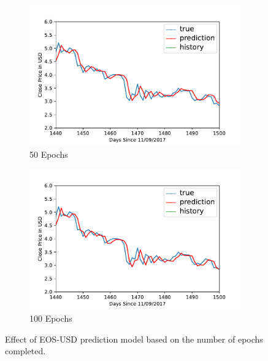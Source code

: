 \begin{figure}[htb]
\begin{subfigure}[b]{0.49\textwidth}
         \label{fig:epochs-25}
     \end{subfigure}
     \\
     \begin{subfigure}[b]{0.49\textwidth}
         \centering
         \includegraphics[width=\textwidth]{images/EOS-USD-epoch-50.pdf}
         \caption{50 Epochs}
         \label{fig:epochs-50}
     \end{subfigure}
     \hfill
    \begin{subfigure}[b]{0.49\textwidth}
         \centering
         \includegraphics[width=\textwidth]{images/EOS-USD-epoch-100.pdf}
         \caption{100 Epochs}
         \label{fig:epochs-100}
     \end{subfigure}

\caption{Effect of EOS-USD prediction model based on the number of epochs completed.}
\label{fig:epoch}
\end{figure}

